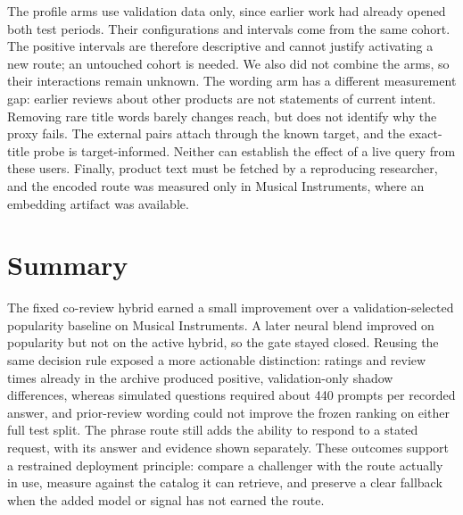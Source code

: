 \documentclass[11pt]{article}
\begin{document}
The profile arms use validation data only, since earlier work had already opened both test periods. Their configurations and intervals come from the same cohort. The positive intervals are therefore descriptive and cannot justify activating a new route; an untouched cohort is needed. We also did not combine the arms, so their interactions remain unknown. The wording arm has a different measurement gap: earlier reviews about other products are not statements of current intent. Removing rare title words barely changes reach, but does not identify why the proxy fails. The external pairs attach through the known target, and the exact-title probe is target-informed. Neither can establish the effect of a live query from these users. Finally, product text must be fetched by a reproducing researcher, and the encoded route was measured only in Musical Instruments, where an embedding artifact was available.

\section{Summary}
The fixed co-review hybrid earned a small improvement over a validation-selected popularity baseline on Musical Instruments. A later neural blend improved on popularity but not on the active hybrid, so the gate stayed closed. Reusing the same decision rule exposed a more actionable distinction: ratings and review times already in the archive produced positive, validation-only shadow differences, whereas simulated questions required about 440 prompts per recorded answer, and prior-review wording could not improve the frozen ranking on either full test split. The phrase route still adds the ability to respond to a stated request, with its answer and evidence shown separately. These outcomes support a restrained deployment principle: compare a challenger with the route actually in use, measure against the catalog it can retrieve, and preserve a clear fallback when the added model or signal has not earned the route.
\end{document}
